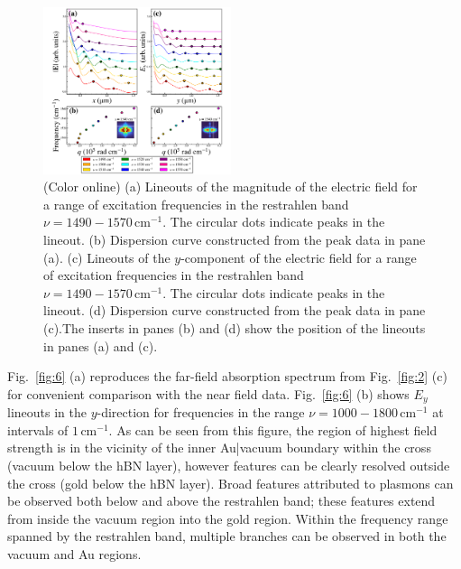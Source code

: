\documentclass[reprint,
amsmath,amssymb,
aip,
jap,
floatfix,]{revtex4-2}
\begin{document}
			\begin{figure}[!htb]
			  \includegraphics[width=0.49\textwidth]{Figures/Fig5.pdf} 
			  \caption{(Color online) (a) Lineouts of the magnitude of the electric field for a range of excitation frequencies in the restrahlen band $\nu = 1490 - 1570\, \mathrm{cm}^{-1}$. The circular dots indicate peaks in the lineout. (b) Dispersion curve constructed from the peak data in pane (a). (c) Lineouts of the $y$-component of the electric field for a range of excitation frequencies in the restrahlen band $\nu = 1490 - 1570\, \mathrm{cm}^{-1}$. The circular dots indicate peaks in the lineout. (d) Dispersion curve constructed from the peak data in pane (c).The inserts in panes (b) and (d) show the position of the lineouts in panes (a) and (c).
			  }
			  \label{fig:5}
			\end{figure}	

			Fig.~\ref{fig:6} (a) reproduces the far-field absorption spectrum from Fig.~\ref{fig:2} (c)  for convenient comparison with the near field data. Fig.~\ref{fig:6} (b) shows $E_y$ lineouts in the $y$-direction for frequencies in the range $\nu = 1000 - 1800\, \mathrm{cm}^{-1}$ at intervals of $1\, \mathrm{cm}^{-1}$. As can be seen from this figure, the region of highest field strength is in the vicinity of the inner Au|vacuum boundary within the cross (vacuum below the hBN layer), however features can be clearly resolved outside the cross (gold below the hBN layer). Broad features attributed to plasmons can be observed both below and above the restrahlen band; these features extend from inside the vacuum region into the gold region. Within the frequency range spanned by the restrahlen band, multiple branches can be observed in both the vacuum and Au regions. 
\end{document}
